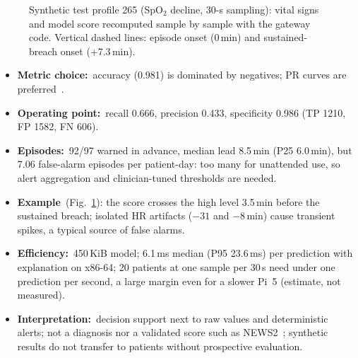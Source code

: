 \documentclass[10pt,a4paper]{article}
\newcommand{\lead}[1]{\textbf{#1}\,}
\begin{document}
\begin{figure}[!htb]
\centering

\caption{Synthetic test profile 265 (SpO$_2$ decline, 30-s sampling): vital signs and model score recomputed sample by sample with the gateway code. Vertical dashed lines: episode onset (0\,min) and sustained-breach onset (+7.3\,min).}
\label{fig:traj}
\end{figure}
\begin{itemize}
\item \lead{Metric choice:} accuracy (0.981) is dominated by negatives; PR curves are preferred~\cite{saito2015pr}.
\item \lead{Operating point:} recall 0.666, precision 0.433, specificity 0.986 (TP 1210, FP 1582, FN 606).
\item \lead{Episodes:} 92/97 warned in advance, median lead 8.5\,min (P25 6.0\,min), but 7.06 false-alarm episodes per patient-day: too many for unattended use, so alert aggregation and clinician-tuned thresholds are needed.
\item \lead{Example} (Fig.~\ref{fig:traj}): the score crosses the high level 3.5\,min before the sustained breach; isolated HR artifacts ($-31$ and $-8$\,min) cause transient spikes, a typical source of false alarms.
\item \lead{Efficiency:} 450\,KiB model; 6.1\,ms median (P95 23.6\,ms) per prediction with explanation on x86-64; 20 patients at one sample per 30\,s need under one prediction per second, a large margin even for a slower Pi~5 (estimate, not measured).
\item \lead{Interpretation:} decision support next to raw values and deterministic alerts; not a diagnosis nor a validated score such as NEWS2~\cite{rcp2017news2}; synthetic results do not transfer to patients without prospective evaluation.
\end{itemize}

\end{document}
